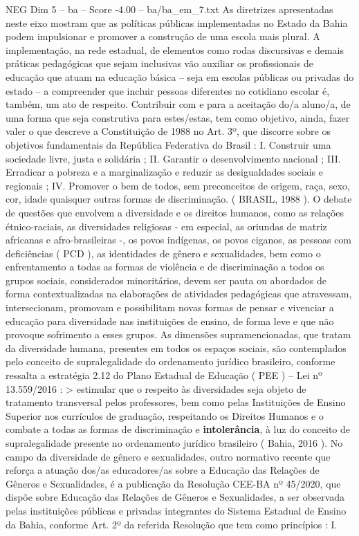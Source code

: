 \begin{textsample}{NEG Dim 5 – ba – Score -4.00 – ba/ba\_em\_7.txt}
As diretrizes apresentadas neste eixo mostram que as políticas públicas implementadas no Estado da Bahia podem impulsionar e promover a construção de uma escola mais plural.
A implementação, na rede estadual, de elementos como rodas discursivas e demais práticas pedagógicas que sejam inclusivas vão auxiliar os profissionais de educação que atuam na educação básica – seja em escolas públicas ou privadas do estado – a compreender que incluir pessoas diferentes no cotidiano escolar é, também, um ato de respeito.
Contribuir com e para a aceitação do/a aluno/a, de uma forma que seja construtiva para estes/estas, tem como objetivo, ainda, fazer valer o que descreve a Constituição de 1988 no Art. 3º, que discorre sobre os objetivos fundamentais da República Federativa do Brasil : I.
Construir uma sociedade livre, justa e solidária ; II.
Garantir o desenvolvimento nacional ; III.
Erradicar a pobreza e a marginalização e reduzir as desigualdades sociais e regionais ; IV.
Promover o bem de todos, sem preconceitos de origem, raça, sexo, cor, idade quaisquer outras formas de discriminação. ( BRASIL, 1988 ).
O debate de questões que envolvem a diversidade e os direitos humanos, como as relações étnico-raciais, as diversidades religiosas - em especial, as oriundas de matriz africanas e afro-brasileiras -, os povos indígenas, os povos ciganos, as pessoas com deficiências ( PCD ), as identidades de gênero e sexualidades, bem como o enfrentamento a todas as formas de violência e de discriminação a todos os grupos sociais, considerados minoritários, devem ser pauta ou abordados de forma contextualizadas na elaborações de atividades pedagógicas que atravessam, intersecionam, promovam e possibilitam novas formas de pensar e vivenciar a educação para diversidade nas instituições de ensino, de forma leve e que não provoque sofrimento a esses grupos.
As dimensões supramencionadas, que tratam da diversidade humana, presentes em todos os espaços sociais, são contemplados pelo conceito de supralegalidade do ordenamento jurídico brasileiro, conforme ressalta a estratégia 2.12 do Plano Estadual de Educação ( PEE ) – Lei nº 13.559/2016 : > estimular que o respeito às diversidades seja objeto de tratamento transversal pelos professores, bem como pelas Instituições de Ensino Superior nos currículos de graduação, respeitando os Direitos Humanos e o combate a todas as formas de discriminação e \textbf{intolerância}, à luz do conceito de supralegalidade presente no ordenamento jurídico brasileiro ( Bahia, 2016 ).
No campo da diversidade de gênero e sexualidades, outro normativo recente que reforça a atuação dos/as educadores/as sobre a Educação das Relações de Gêneros e Sexualidades, é a publicação da Resolução CEE-BA nº 45/2020, que dispõe sobre Educação das Relações de Gêneros e Sexualidades, a ser observada pelas instituições públicas e privadas integrantes do Sistema Estadual de Ensino da Bahia, conforme Art. 2º da referida Resolução que tem como princípios : I.

\end{textsample}
